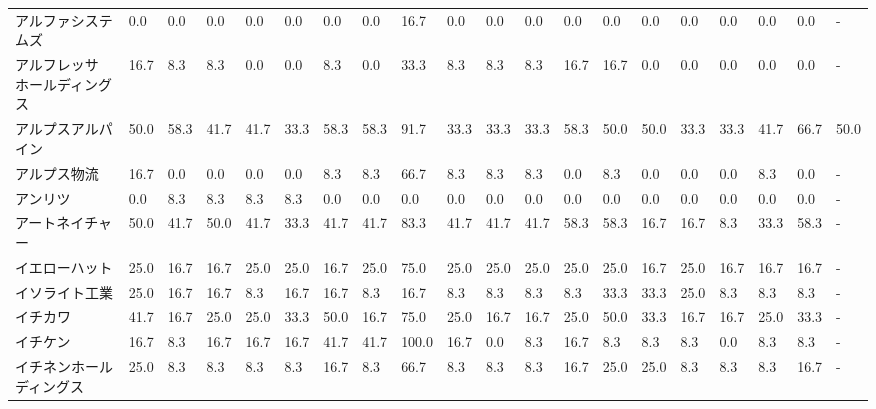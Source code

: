 \documentclass[a4paper，11pt]{jsarticle}
\begin{document}
\begin{longtable}[c]{lp{3mm}p{3mm}p{3mm}p{3mm}p{3mm}p{3mm}p{3mm}p{3mm}p{3mm}p{3mm}p{3mm}p{3mm}p{3mm}p{3mm}p{3mm}p{3mm}p{3mm}p{3mm}p{3mm}}
アルファシステムズ       &    0.0 &    0.0 &       0.0 &       0.0 &        0.0 &    0.0 &    0.0 &   16.7 &     0.0 &     0.0 &    0.0 &   0.0 &    0.0 &     0.0 &     0.0 &   0.0 &   0.0 &   0.0 &     - \\
アルフレッサ　ホールディングス &   16.7 &    8.3 &       8.3 &       0.0 &        0.0 &    8.3 &    0.0 &   33.3 &     8.3 &     8.3 &    8.3 &  16.7 &   16.7 &     0.0 &     0.0 &   0.0 &   0.0 &   0.0 &     - \\
アルプスアルパイン       &   50.0 &   58.3 &      41.7 &      41.7 &       33.3 &   58.3 &   58.3 &   91.7 &    33.3 &    33.3 &   33.3 &  58.3 &   50.0 &    50.0 &    33.3 &  33.3 &  41.7 &  66.7 &  50.0 \\
アルプス物流          &   16.7 &    0.0 &       0.0 &       0.0 &        0.0 &    8.3 &    8.3 &   66.7 &     8.3 &     8.3 &    8.3 &   0.0 &    8.3 &     0.0 &     0.0 &   0.0 &   8.3 &   0.0 &     - \\
アンリツ            &    0.0 &    8.3 &       8.3 &       8.3 &        8.3 &    0.0 &    0.0 &    0.0 &     0.0 &     0.0 &    0.0 &   0.0 &    0.0 &     0.0 &     0.0 &   0.0 &   0.0 &   0.0 &     - \\
アートネイチャー        &   50.0 &   41.7 &      50.0 &      41.7 &       33.3 &   41.7 &   41.7 &   83.3 &    41.7 &    41.7 &   41.7 &  58.3 &   58.3 &    16.7 &    16.7 &   8.3 &  33.3 &  58.3 &     - \\
イエローハット         &   25.0 &   16.7 &      16.7 &      25.0 &       25.0 &   16.7 &   25.0 &   75.0 &    25.0 &    25.0 &   25.0 &  25.0 &   25.0 &    16.7 &    25.0 &  16.7 &  16.7 &  16.7 &     - \\
イソライト工業         &   25.0 &   16.7 &      16.7 &       8.3 &       16.7 &   16.7 &    8.3 &   16.7 &     8.3 &     8.3 &    8.3 &   8.3 &   33.3 &    33.3 &    25.0 &   8.3 &   8.3 &   8.3 &     - \\
イチカワ            &   41.7 &   16.7 &      25.0 &      25.0 &       33.3 &   50.0 &   16.7 &   75.0 &    25.0 &    16.7 &   16.7 &  25.0 &   50.0 &    33.3 &    16.7 &  16.7 &  25.0 &  33.3 &     - \\
イチケン            &   16.7 &    8.3 &      16.7 &      16.7 &       16.7 &   41.7 &   41.7 &  100.0 &    16.7 &     0.0 &    8.3 &  16.7 &    8.3 &     8.3 &     8.3 &   0.0 &   8.3 &   8.3 &     - \\
イチネンホールディングス    &   25.0 &    8.3 &       8.3 &       8.3 &        8.3 &   16.7 &    8.3 &   66.7 &     8.3 &     8.3 &    8.3 &  16.7 &   25.0 &    25.0 &     8.3 &   8.3 &   8.3 &  16.7 &     - \\

\end{longtable}
\end{document}
